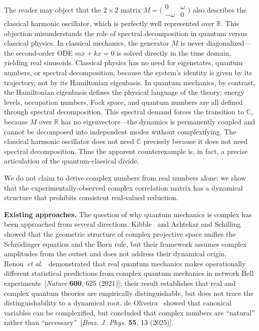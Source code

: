 \documentclass[aps,pra,preprint,groupedaddress,amsmath,amssymb,floatfix]{revtex4-2}
\begin{document}
The reader may object that the $2\times 2$ matrix $M = \bigl(\begin{smallmatrix}0 & \omega \\ -\omega & 0\end{smallmatrix}\bigr)$ also describes the classical harmonic oscillator, which is perfectly well represented over $\mathbb{R}$. This objection misunderstands the role of spectral decomposition in quantum versus classical physics. In classical mechanics, the generator $M$ is never diagonalized---the second-order ODE $m\ddot{x} + kx = 0$ is solved directly in the time domain, yielding real sinusoids. Classical physics has no need for eigenstates, quantum numbers, or spectral decomposition, because the system's identity is given by its trajectory, not by its Hamiltonian eigenbasis. In quantum mechanics, by contrast, the Hamiltonian eigenbasis defines the physical language of the theory: energy levels, occupation numbers, Fock space, and quantum numbers are all defined through spectral decomposition. This spectral demand forces the transition to $\mathbb{C}$, because $M$ over $\mathbb{R}$ has no eigenvectors---the dynamics is permanently coupled and cannot be decomposed into independent modes without complexifying. The classical harmonic oscillator does not need $\mathbb{C}$ precisely because it does not need spectral decomposition. Thus the apparent counterexample is, in fact, a precise articulation of the quantum-classical divide.

We do not claim to derive complex numbers from real numbers alone; we show that the experimentally-observed complex correlation matrix has a dynamical structure that prohibits consistent real-valued reduction.

\textbf{Existing approaches.} The question of why quantum mechanics is complex has been approached from several directions. Kibble~\cite{kibble1979} and Ashtekar and Schilling~\cite{ashtekar1999} showed that the geometric structure of complex projective space unifies the Schr\"odinger equation and the Born rule, but their framework assumes complex amplitudes from the outset and does not address their dynamical origin. Renou~\textit{et al.}~\cite{renou2021} demonstrated that real quantum mechanics makes operationally different statistical predictions from complex quantum mechanics in network Bell experiments~[\textit{Nature} \textbf{600}, 625 (2021)]; their result establishes that real and complex quantum theories are empirically distinguishable, but does not trace the distinguishability to a dynamical root. de Oliveira~\cite{deoliveira2023} showed that canonical variables can be complexified, but concluded that complex numbers are ``natural'' rather than ``necessary''~[\textit{Braz. J. Phys.} \textbf{55}, 13 (2025)].
\end{document}
